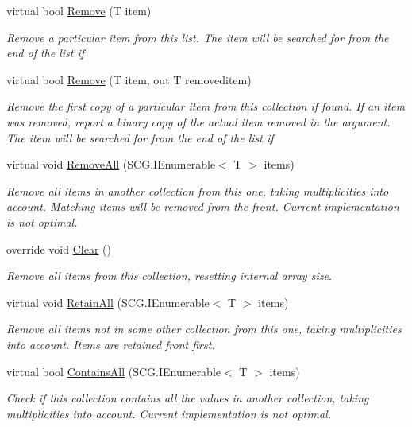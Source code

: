 \begin{DoxyCompactItemize}
virtual bool \hyperlink{class_c5_1_1_hashed_array_list_a4453b3955bce1670914b4aa2f469b4c0}{Remove} (T item)
\begin{DoxyCompactList}\small\item\em Remove a particular item from this list. The item will be searched for from the end of the list if \end{DoxyCompactList}\item 
virtual bool \hyperlink{class_c5_1_1_hashed_array_list_aaf108802a6f4024858b9d178109126ee}{Remove} (T item, out T removeditem)
\begin{DoxyCompactList}\small\item\em Remove the first copy of a particular item from this collection if found. If an item was removed, report a binary copy of the actual item removed in the argument. The item will be searched for from the end of the list if \end{DoxyCompactList}\item 
virtual void \hyperlink{class_c5_1_1_hashed_array_list_a9598f605bb5e2de9f4a1bfce80a0dd0b}{Remove\+All} (S\+C\+G.\+I\+Enumerable$<$ T $>$ items)
\begin{DoxyCompactList}\small\item\em Remove all items in another collection from this one, taking multiplicities into account. Matching items will be removed from the front. Current implementation is not optimal. \end{DoxyCompactList}\item 
override void \hyperlink{class_c5_1_1_hashed_array_list_aeca323e5f962607ee4384549aaba5d28}{Clear} ()
\begin{DoxyCompactList}\small\item\em Remove all items from this collection, resetting internal array size. \end{DoxyCompactList}\item 
virtual void \hyperlink{class_c5_1_1_hashed_array_list_a2c474cfc8e742163eec9bfba91169a79}{Retain\+All} (S\+C\+G.\+I\+Enumerable$<$ T $>$ items)
\begin{DoxyCompactList}\small\item\em Remove all items not in some other collection from this one, taking multiplicities into account. Items are retained front first. \end{DoxyCompactList}\item 
virtual bool \hyperlink{class_c5_1_1_hashed_array_list_ae3145f69b175e6b3d9af471b3ef89c80}{Contains\+All} (S\+C\+G.\+I\+Enumerable$<$ T $>$ items)
\begin{DoxyCompactList}\small\item\em Check if this collection contains all the values in another collection, taking multiplicities into account. Current implementation is not optimal. \end{DoxyCompactList}\item 

\end{DoxyCompactItemize}
